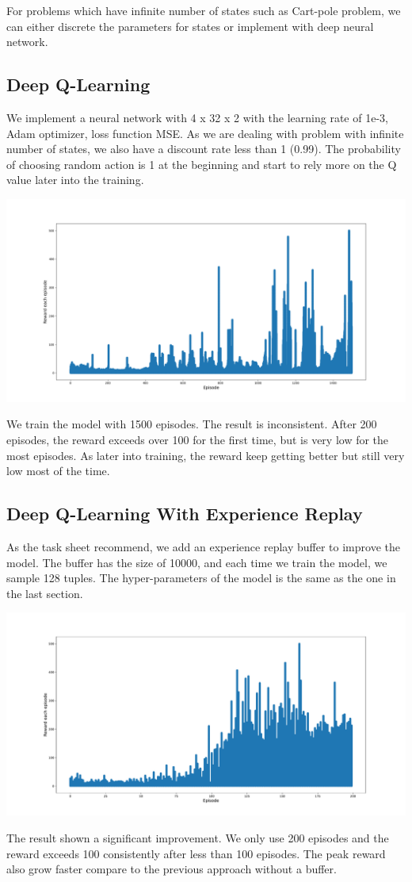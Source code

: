 \documentclass[11pt]{article}
\begin{document}
For problems which have infinite number of states such as Cart-pole problem, we can either discrete the parameters for states or implement with deep neural network.

\subsection{Deep Q-Learning}

We implement a neural network with 4 x 32 x 2 with the learning rate of 1e-3, Adam optimizer, loss function MSE. As we are dealing with problem with infinite number of states, we also have a discount rate less than 1 (0.99). The probability of choosing random action is 1 at the beginning and start to rely more on the Q value later into the training.

\includegraphics[width=\textwidth,height=\textheight,keepaspectratio]{figures/dqn.png}

We train the model with 1500 episodes. The result is inconsistent. After 200 episodes, the reward exceeds over 100 for the first time, but is very low for the most episodes. As later into training, the reward keep getting better but still very low most of the time.

\subsection{Deep Q-Learning With Experience Replay}

As the task sheet recommend, we add an experience replay buffer to improve the model. The buffer has the size of 10000, and each time we train the model, we sample 128 tuples. The hyper-parameters of the model is the same as the one in the last section.

\includegraphics[width=\textwidth,height=\textheight,keepaspectratio]{figures/dqn_buffer.pdf}

The result shown a significant improvement. We only use 200 episodes and the reward exceeds 100 consistently after less than 100 episodes. The peak reward also grow faster compare to the previous approach without a buffer.


\end{document}
